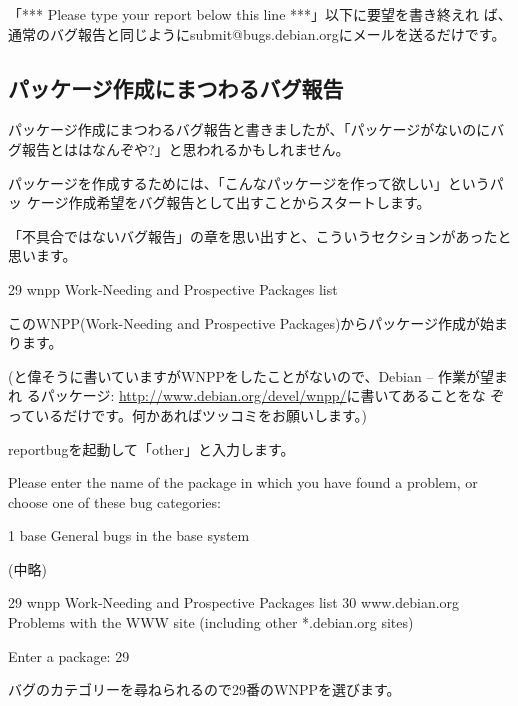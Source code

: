 \documentclass[mingoth,a4paper]{jsarticle}
\begin{document}
「*** Please type your report below this line ***」以下に要望を書き終えれ
ば、通常のバグ報告と同じようにsubmit@bugs.debian.orgにメールを送るだけです。

\subsection{パッケージ作成にまつわるバグ報告}

パッケージ作成にまつわるバグ報告と書きましたが、「パッケージがないのにバ
グ報告とははなんぞや?」と思われるかもしれません。

パッケージを作成するためには、「こんなパッケージを作って欲しい」というパッ
ケージ作成希望をバグ報告として出すことからスタートします。

「不具合ではないバグ報告」の章を思い出すと、こういうセクションがあったと
思います。

\begin{commandline}
29 wnpp                  Work-Needing and Prospective Packages list
\end{commandline}

このWNPP(Work-Needing and Prospective Packages)からパッケージ作成が始ま
ります。

(と偉そうに書いていますがWNPPをしたことがないので、Debian -- 作業が望まれ
るパッケージ: \url{http://www.debian.org/devel/wnpp/}に書いてあることをな
ぞっているだけです。何かあればツッコミをお願いします。)

reportbugを起動して「other」と入力します。

\begin{commandline}
Please enter the name of the package in which you have found a problem, or
choose one of these bug categories:

 1 base                  General bugs in the base system

(中略)

29 wnpp                  Work-Needing and Prospective Packages list
30 www.debian.org        Problems with the WWW site (including other
                         *.debian.org sites)

Enter a package: 29
\end{commandline}
バグのカテゴリーを尋ねられるので29番のWNPPを選びます。
\end{document}
